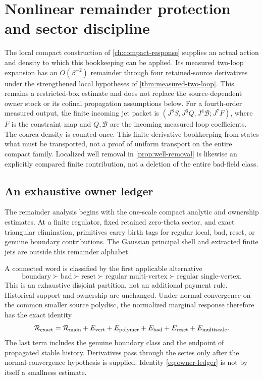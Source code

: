 \documentclass[11pt,oneside,openany]{book}
\theoremstyle{definition}
\theoremstyle{remark}
\newcommand{\src}[2]{\cite[#2]{#1}}
\begin{document}
\chapter{Nonlinear remainder protection and sector discipline}
\label{ch:remainder}
The local compact construction of \cref{ch:compact-response} supplies
an actual action and density to which this bookkeeping can be applied.
Its measured two-loop expansion has an $O(\beta^{-2})$ remainder
through four retained-source derivatives under the strengthened local
hypotheses of \cref{thm:measured-two-loop}. This remains a restricted-box
estimate and does not replace the source-dependent owner stock or its
cofinal propagation assumptions below. For a fourth-order measured
output, the finite incoming jet packet is
$(J^8S,J^6Q,J^4\mathcal B;J^7F)$, where $F$ is the constraint map and
$Q,\mathcal B$ are the incoming measured loop coefficients. The
coarea density is counted once. This finite derivative bookkeeping
from \src{SM}{V8} states what must be transported, not a proof of
uniform transport on the entire compact family. Localized well removal in \cref{prop:well-removal}
is likewise an explicitly compared finite contribution, not a deletion
of the entire bad-field class.

\section{An exhaustive owner ledger}
The remainder analysis begins with the one-scale compact analytic and ownership estimates. At a finite regulator, fixed retained zero-theta sector, and exact triangular elimination, primitives carry birth tags for regular local, bad, reset, or genuine boundary contributions. The Gaussian principal shell and extracted finite jets are outside this remainder alphabet.

A connected word is classified by the first applicable alternative
\[
\text{boundary}\succ\text{bad}\succ\text{reset}\succ
\text{regular multi-vertex}\succ\text{regular single-vertex}.
\]
This is an exhaustive disjoint partition, not an additional payment rule. Historical support and ownership are unchanged. Under normal convergence on the common smaller source polydisc, the normalized marginal response therefore has the exact identity
\begin{equation}\label{eq:owner-ledger}
\mathcal R_{\rm exact}=\mathcal R_{\rm main}
+E_{\rm vert}+E_{\rm polymer}+E_{\rm bad}
+E_{\rm reset}+E_{\rm multiscale}.
\end{equation}
The last term includes the genuine boundary class and the endpoint of propagated stable history. Derivatives pass through the series only after the normal-convergence hypothesis is supplied. Identity \cref{eq:owner-ledger} is not by itself a smallness estimate. \src{PAR}{V1}
\end{document}
